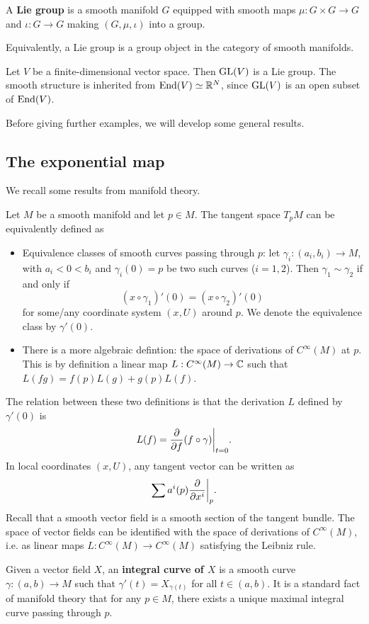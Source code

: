 \documentclass[11pt, english]{article}
\begin{document}
A \textbf{Lie group} is a smooth manifold $G$ equipped with smooth maps $\mu:G \times G \to G$ and $\iota:G \to G$ making $(G,\mu,\iota)$ into a group.

Equivalently, a Lie group is a group object in the category of smooth manifolds.

\begin{example}
 Let $V$ be a finite-dimensional vector space. Then $\operatorname{GL}(V)$ is a Lie group. The smooth structure is inherited from $\operatorname{End}(V) \simeq \mathbb{R}^N$, since $\operatorname{GL}(V)$ is an open subset of $\operatorname{End}(V)$.
\end{example}

Before giving further examples, we will develop some general results.

\subsection{The exponential map}

We recall some results from manifold theory.

Let $M$ be a smooth manifold and let $p \in M$. The tangent space $T_pM$ can be equivalently defined as
\begin{itemize}
\item Equivalence classes of smooth curves passing through $p$: let $\gamma_i:(a_i,b_i) \to M$, with $a_i < 0 < b_i$ and $\gamma_i(0)=p$ be two such curves ($i=1,2$). Then $\gamma_1 \sim \gamma_2$ if and only if 
$$
(x \circ \gamma_1)'(0) = (x \circ \gamma_2)'(0)
$$
for some/any coordinate system $(x,U)$ around $p$. We denote the equivalence class by $\gamma'(0)$.
\item There is a more algebraic defintion: the space of derivations of $C^\infty (M)$ at $p$. This is by definition a linear map $L:C^\infty(M) \to \mathbb{C}$ such that $L(fg) = f(p)L(g) + g(p)L(f)$.
\end{itemize}
The relation between these two definitions is that the derivation $L$ defined by $\gamma'(0)$ is
$$
L(f) = \restr{\dd{}{f}(f \circ \gamma)}{t=0}.
$$
In local coordinates $(x,U)$, any tangent vector can be written as
$$
\sum a^i(p) \restr{\dd{}{x^i}}{p}.
$$
Recall that a smooth vector field is a smooth section of the tangent bundle. The space of vector fields can be identified with the space of derivations of $C^\infty(M)$, i.e. as linear maps $L:C^\infty(M) \to C^\infty(M)$ satisfying the Leibniz rule.

Given a vector field $X$, an \textbf{integral curve of $X$} is a smooth curve $\gamma:(a,b) \to M$ such that $\gamma'(t) = X_{\gamma(t)}$ for all $t \in (a,b)$. It is a standard fact of manifold theory that for any $p \in M$, there exists a unique maximal integral curve passing through $p$. 
\end{document}

